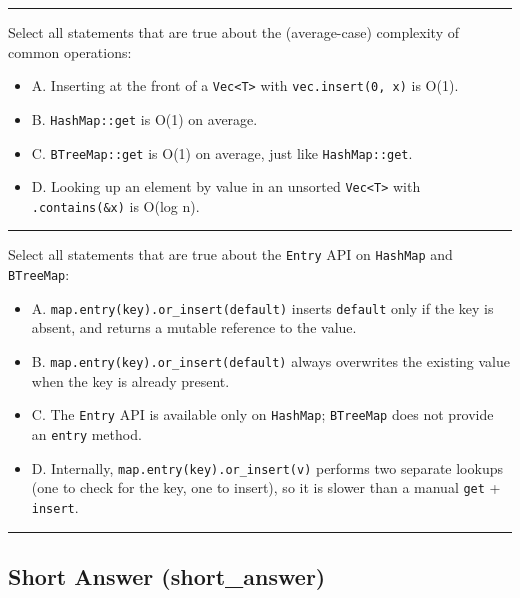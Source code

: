 \documentclass[
  11pt,
]{article}
\providecommand{\tightlist}{%
  \setlength{\itemsep}{0pt}\setlength{\parskip}{0pt}}
\begin{document}
\begin{center}\rule{0.5\linewidth}{0.5pt}\end{center}

Select all statements that are true about the (average-case) complexity
of common operations:

\begin{itemize}
\tightlist
\item[$\square$]
  A. Inserting at the front of a \texttt{Vec\textless{}T\textgreater{}}
  with \texttt{vec.insert(0,\ x)} is O(1).
\item[$\square$]
  B. \texttt{HashMap::get} is O(1) on average.
\item[$\square$]
  C. \texttt{BTreeMap::get} is O(1) on average, just like
  \texttt{HashMap::get}.
\item[$\square$]
  D. Looking up an element by value in an unsorted
  \texttt{Vec\textless{}T\textgreater{}} with \texttt{.contains(\&x)} is
  O(log n).
\end{itemize}

\begin{center}\rule{0.5\linewidth}{0.5pt}\end{center}

Select all statements that are true about the \texttt{Entry} API on
\texttt{HashMap} and \texttt{BTreeMap}:

\begin{itemize}
\tightlist
\item[$\square$]
  A. \texttt{map.entry(key).or\_insert(default)} inserts
  \texttt{default} only if the key is absent, and returns a mutable
  reference to the value.
\item[$\square$]
  B. \texttt{map.entry(key).or\_insert(default)} always overwrites the
  existing value when the key is already present.
\item[$\square$]
  C. The \texttt{Entry} API is available only on \texttt{HashMap};
  \texttt{BTreeMap} does not provide an \texttt{entry} method.
\item[$\square$]
  D. Internally, \texttt{map.entry(key).or\_insert(v)} performs two
  separate lookups (one to check for the key, one to insert), so it is
  slower than a manual \texttt{get} + \texttt{insert}.
\end{itemize}

\begin{center}\rule{0.5\linewidth}{0.5pt}\end{center}

\subsection{Short Answer
(short\_answer)}\label{short-answer-short_answer}
\end{document}
